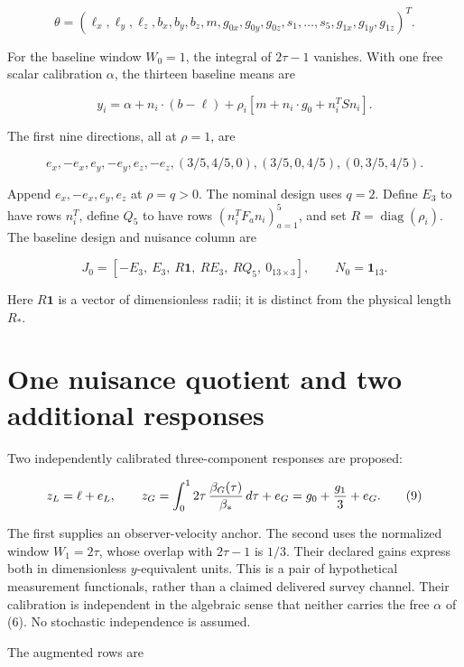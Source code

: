 \documentclass[aps,prd,preprint,onecolumn,notitlepage]{revtex4-2}
\begin{document}
\[
\theta=(\ell_x,\ell_y,\ell_z,b_x,b_y,b_z,m,
g_{0x},g_{0y},g_{0z},s_1,\ldots,s_5,g_{1x},g_{1y},g_{1z})^T.
                                                               \tag{5}
\]

For the baseline window \(W_0=1\), the integral of \(2\tau-1\) vanishes. With one free scalar calibration \(\alpha\), the thirteen baseline means are

\[
y_i=\alpha+n_i\cdot(b-\ell)
       +\rho_i[m+n_i\cdot g_0+n_i^TSn_i].                 \tag{6}
\]

The first nine directions, all at \(\rho=1\), are

\[
e_x,-e_x,e_y,-e_y,e_z,-e_z,
(3/5,4/5,0),(3/5,0,4/5),(0,3/5,4/5).                    \tag{7}
\]

Append \(e_x,-e_x,e_y,e_z\) at \(\rho=q>0\). The nominal design uses \(q=2\). Define \(E_3\) to have rows \(n_i^T\), define \(Q_5\) to have rows \((n_i^TF_an_i)_{a=1}^5\), and set \(R=\operatorname{diag}(\rho_i)\). The baseline design and nuisance column are

\[
J_0=[-E_3,\ E_3,\ R\mathbf1,\ RE_3,\ RQ_5,\ 0_{13\times3}],
\qquad N_0=\mathbf1_{13}.                                \tag{8}
\]

Here \(R\mathbf1\) is a vector of dimensionless radii; it is distinct from the physical length \(R_*\).

\hypertarget{one-nuisance-quotient-and-two-additional-responses}{%
\section{One nuisance quotient and two additional responses}\label{one-nuisance-quotient-and-two-additional-responses}}

Two independently calibrated three-component responses are proposed:

\[
z_L=\ell+e_L,\qquad
z_G=\int_0^1 2\tau\,{\beta_G(\tau)\over\beta_*}\,d\tau+e_G
     =g_0+{g_1\over3}+e_G.                              \tag{9}
\]

The first supplies an observer-velocity anchor. The second uses the normalized window \(W_1=2\tau\), whose overlap with \(2\tau-1\) is \(1/3\). Their declared gains express both in dimensionless \(y\)-equivalent units. This is a pair of hypothetical measurement functionals, rather than a claimed delivered survey channel. Their calibration is independent in the algebraic sense that neither carries the free \(\alpha\) of (6). No stochastic independence is assumed.

The augmented rows are
\end{document}
